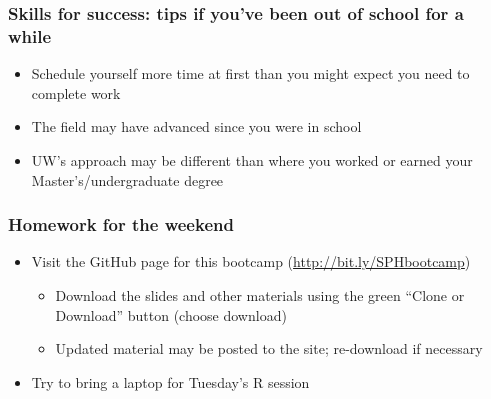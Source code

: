 \documentclass[12pt]{beamer}
\newcommand{\myframe}[1]{\begin{frame} \frametitle{#1}}
\newenvironment{spaceitemize}
{ \begin{itemize}
    \setlength{\itemsep}{10pt}
    \setlength{\parskip}{0pt}
    \setlength{\parsep}{0pt}     }
{ \end{itemize}                  }
\begin{document}
\myframe{Skills for success: tips if you've been out of school for a while}
\begin{spaceitemize}
\item Schedule yourself more time at first than you might expect you need to complete work
\item The field may have advanced since you were in school
\item UW's approach may be different than where you worked or earned your Master's/undergraduate degree
\end{spaceitemize}
\end{frame}

\myframe{Homework for the weekend}
\begin{spaceitemize}
\item Visit the GitHub page for this bootcamp (\url{http://bit.ly/SPHbootcamp})
\begin{spaceitemize}
\item Download the slides and other materials using the green ``Clone or Download'' button (choose download)
\item Updated material may be posted to the site; re-download if necessary
\end{spaceitemize}
\item Try to bring a laptop for Tuesday's R session
\end{spaceitemize}
\end{frame}
\end{document}
